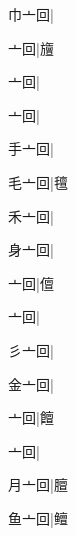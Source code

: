 \begin{multicols}{2}
{{\cjk{}巾亠回}|{}\par
{亠回}|{\cjk{}旜}\par
{亠回}|{}\par
{亠回}|{}\par
{\cjk{}手亠回}|{}\par
{\cjk{}毛亠回}|{\cjk{}氊}\par
{\cjk{}禾亠回}|{}\par
{\cjk{}身亠回}|{}\par
{亠回}|{\cjk{}儃}\par
{亠回}|{}\par
{\cjk{}彡亠回}|{}\par
{\cjk{}金亠回}|{}\par
{亠回}|{\cjk{}饘}\par
{亠回}|{}\par
{\cjk{}月亠回}|{\cjk{}膻}\par
{\cjk{}鱼亠回}|{\cjk{}鳣}\par
}
\end{multicols}
